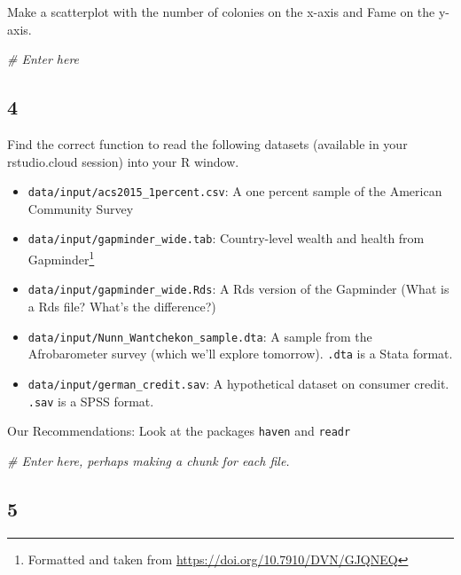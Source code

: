 \documentclass[]{book}
\newenvironment{Shaded}{\begin{snugshade}}{\end{snugshade}}
\newcommand{\CommentTok}[1]{\textcolor[rgb]{0.56,0.35,0.01}{\textit{#1}}}
\providecommand{\tightlist}{%
  \setlength{\itemsep}{0pt}\setlength{\parskip}{0pt}}
\let\rmarkdownfootnote\footnote%
\def\footnote{\protect\rmarkdownfootnote}
\theoremstyle{definition}
\theoremstyle{definition}
\theoremstyle{definition}
\theoremstyle{remark}
\begin{document}
Make a scatterplot with the number of colonies on the x-axis and Fame on the y-axis.

\begin{Shaded}
\begin{Highlighting}[]
\CommentTok{# Enter here}
\end{Highlighting}
\end{Shaded}

\hypertarget{section-3}{%
\subsection*{4}\label{section-3}}

Find the correct function to read the following datasets (available in your rstudio.cloud session) into your R window.

\begin{itemize}
\tightlist
\item
  \texttt{data/input/acs2015\_1percent.csv}: A one percent sample of the American Community Survey
\item
  \texttt{data/input/gapminder\_wide.tab}: Country-level wealth and health from Gapminder\footnote{Formatted and taken from \url{https://doi.org/10.7910/DVN/GJQNEQ}}
\item
  \texttt{data/input/gapminder\_wide.Rds}: A Rds version of the Gapminder (What is a Rds file? What's the difference?)
\item
  \texttt{data/input/Nunn\_Wantchekon\_sample.dta}: A sample from the Afrobarometer survey (which we'll explore tomorrow). \texttt{.dta} is a Stata format.
\item
  \texttt{data/input/german\_credit.sav}: A hypothetical dataset on consumer credit. \texttt{.sav} is a SPSS format.
\end{itemize}

Our Recommendations: Look at the packages \texttt{haven} and \texttt{readr}

\begin{Shaded}
\begin{Highlighting}[]
\CommentTok{# Enter here, perhaps making a chunk for each file.}
\end{Highlighting}
\end{Shaded}

\hypertarget{section-4}{%
\subsection*{5}\label{section-4}}
\end{document}
